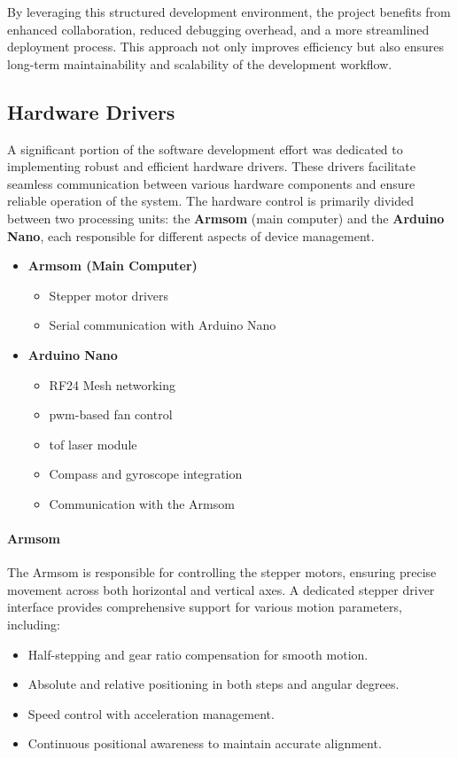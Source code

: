 By leveraging this structured development environment, the project benefits from enhanced collaboration, reduced debugging overhead, and a more streamlined deployment process. This approach not only improves efficiency but also ensures long-term maintainability and scalability of the development workflow.  

\subsection{Hardware Drivers}
A significant portion of the software development effort was dedicated to implementing robust and efficient hardware drivers. These drivers facilitate seamless communication between various hardware components and ensure reliable operation of the system. The hardware control is primarily divided between two processing units: the \textbf{Armsom} (main computer) and the \textbf{Arduino Nano}, each responsible for different aspects of device management.

\begin{itemize}
	\item \textbf{Armsom (Main Computer)}
	\begin{itemize}
		\item Stepper motor drivers
		\item Serial communication with Arduino Nano
	\end{itemize}
	\item \textbf{Arduino Nano}
	\begin{itemize}
		\item RF24 Mesh networking
		\item \acrfull{pwm}-based fan control
		\item \acrshort{tof} laser module
		\item Compass and gyroscope integration
		\item Communication with the Armsom
	\end{itemize}
\end{itemize}

\paragraph{Armsom}
The Armsom is responsible for controlling the stepper motors, ensuring precise movement across both horizontal and vertical axes. A dedicated stepper driver interface provides comprehensive support for various motion parameters, including:
\begin{itemize}
	\item Half-stepping and gear ratio compensation for smooth motion.
	\item Absolute and relative positioning in both steps and angular degrees.
	\item Speed control with acceleration management.
	\item Continuous positional awareness to maintain accurate alignment.
\end{itemize}

